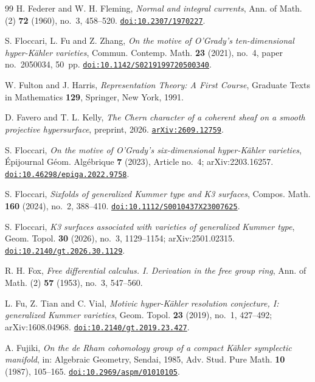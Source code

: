 \documentclass[11pt,reqno]{amsart}
\theoremstyle{plain}
\theoremstyle{definition}
\theoremstyle{remark}
\begin{document}
\begin{thebibliography}{99}
H. Federer and W. H. Fleming,
\emph{Normal and integral currents},
Ann. of Math. (2) \textbf{72} (1960), no.~3, 458--520.
\href{https://doi.org/10.2307/1970227}{\texttt{doi:10.2307/1970227}}.

S. Floccari, L. Fu and Z. Zhang,
\emph{On the motive of O'Grady's ten-dimensional hyper-K\"ahler varieties},
Commun. Contemp. Math. \textbf{23} (2021), no.~4, paper no.~2050034,
50~pp.
\href{https://doi.org/10.1142/S0219199720500340}{\texttt{doi:10.1142/S0219199720500340}}.

W. Fulton and J. Harris,
\emph{Representation Theory: A First Course},
Graduate Texts in Mathematics \textbf{129}, Springer, New York, 1991.

D. Favero and T. L. Kelly,
\emph{The Chern character of a coherent sheaf on a smooth projective
hypersurface},
preprint, 2026.
\href{https://arxiv.org/abs/2609.12759}{\texttt{arXiv:2609.12759}}.

S. Floccari,
\emph{On the motive of O'Grady's six-dimensional hyper-K\"ahler varieties},
\'Epijournal G\'eom. Alg\'ebrique \textbf{7} (2023), Article no.~4;
arXiv:2203.16257.
\href{https://doi.org/10.46298/epiga.2022.9758}{\texttt{doi:10.46298/epiga.2022.9758}}.

S. Floccari,
\emph{Sixfolds of generalized Kummer type and K3 surfaces},
Compos. Math. \textbf{160} (2024), no.~2, 388--410.
\href{https://doi.org/10.1112/S0010437X23007625}{\texttt{doi:10.1112/S0010437X23007625}}.

S. Floccari,
\emph{K3 surfaces associated with varieties of generalized Kummer type},
Geom. Topol. \textbf{30} (2026), no.~3, 1129--1154; arXiv:2501.02315.
\href{https://doi.org/10.2140/gt.2026.30.1129}{\texttt{doi:10.2140/gt.2026.30.1129}}.

R. H. Fox,
\emph{Free differential calculus. I. Derivation in the free group ring},
Ann. of Math. (2) \textbf{57} (1953), no.~3, 547--560.

L. Fu, Z. Tian and C. Vial,
\emph{Motivic hyper-K\"ahler resolution conjecture, I: generalized Kummer
varieties},
Geom. Topol. \textbf{23} (2019), no.~1, 427--492; arXiv:1608.04968.
\href{https://doi.org/10.2140/gt.2019.23.427}{\texttt{doi:10.2140/gt.2019.23.427}}.

A. Fujiki,
\emph{On the de Rham cohomology group of a compact K\"ahler symplectic
manifold},
in: Algebraic Geometry, Sendai, 1985, Adv. Stud. Pure Math. \textbf{10}
(1987), 105--165.
\href{https://doi.org/10.2969/aspm/01010105}{\texttt{doi:10.2969/aspm/01010105}}.


\end{thebibliography}
\end{document}
